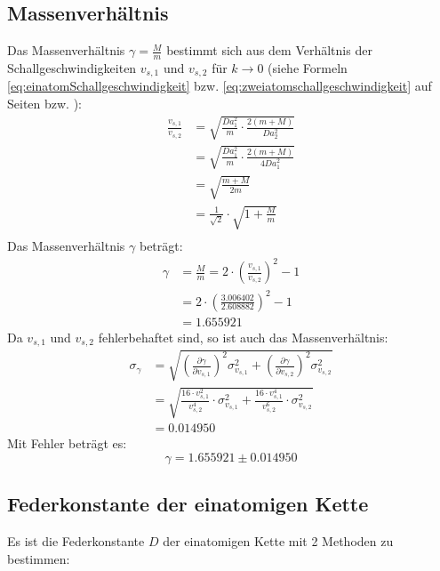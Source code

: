 \documentclass[a4paper,titlepage]{scrartcl}
\numberwithin{equation}{section}
\begin{document}
\subsection{Massenverhältnis}
Das Massenverhältnis $\gamma=\frac{M}{m}$ bestimmt sich aus dem Verhältnis der Schallgeschwindigkeiten $v_{s,1}$ und $v_{s,2}$ für $k \rightarrow 0$ (siehe Formeln \ref{eq:einatomSchallgeschwindigkeit} bzw. \ref{eq:zweiatomschallgeschwindigkeit} auf Seiten \pageref{eq:einatomSchallgeschwindigkeit} bzw. \pageref{eq:zweiatomschallgeschwindigkeit}):
\begin{align*}
\frac{v_{s,1}}{v_{s,2}}&=\sqrt{\frac{Da_1^2}{m} \cdot \frac{2(m+M)}{Da_2^2}}\\
&=\sqrt{\frac{D a_1^2}{m} \cdot \frac{2(m+M)}{4Da_1^2}}\\
&=\sqrt{\frac{m+M}{2m}}\\
&=\frac{1}{\sqrt{2}} \cdot \sqrt{1+\frac{M}{m}}\\
\end{align*}
Das Massenverhältnis $\gamma$ beträgt:
\begin{align*}
\gamma&=\frac{M}{m}= 2 \cdot \left(\frac{v_{s,1}}{v_{s,2}}\right)^2-1\\
&=2 \cdot \left(\frac{3.006402}{2.608882}\right)^2-1\\
&=1.655921
\end{align*}
Da $v_{s,1}$ und $v_{s,2}$ fehlerbehaftet sind, so ist auch das Massenverhältnis:
\begin{align*}
\sigma_{\gamma}&=\sqrt{\left( \frac{\partial \gamma}{\partial v_{s,1}} \right)^2 \sigma^2_{v_{s,1}} + \left( \frac{\partial \gamma}{\partial v_{s,2}} \right)^2 \sigma^2_{v_{s,2}}}\\
&=\sqrt{\frac{16 \cdot v^2_{s,1}}{v_{s,2}^4} \cdot \sigma^2_{v_{s,1}}+\frac{16 \cdot v^4_{s,1}}{v_{s,2}^6} \cdot \sigma^2_{v_{s,2}}}\\
&=0.014950
\end{align*}
Mit Fehler beträgt es:
\begin{equation*}
\boxed{\gamma=1.655921 \pm 0.014950}
\end{equation*}
\subsection{Federkonstante der einatomigen Kette}
Es ist die Federkonstante $D$ der einatomigen Kette mit 2 Methoden zu bestimmen:
\end{document}
